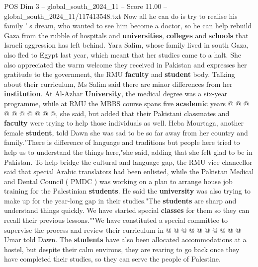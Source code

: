 \begin{textsample}{POS Dim 3 – global\_south\_2024\_11 – Score 11.00 – global\_south\_2024\_11/117413548.txt}
Now all he can do is try to realise his family ' s dream, who wanted to see him become a doctor, so he can help rebuild Gaza from the rubble of hospitals and \textbf{universities}, \textbf{colleges} and \textbf{schools} that Israeli aggression has left behind.
Yara Salim, whose family lived in south Gaza, also fled to Egypt last year, which meant that her studies came to a halt.
She also appreciated the warm welcome they received in Pakistan and expresses her gratitude to the government, the RMU \textbf{faculty} and \textbf{student} body.
Talking about their curriculum, Ms Salim said there are minor differences from her \textbf{institution}.
At Al-Azhar \textbf{University}, the medical degree was a six-year programme, while at RMU the MBBS course spans five \textbf{academic} years @ @ @ @ @ @ @ @ @ @, she said, but added that their Pakistani classmates and \textbf{faculty} were trying to help those individuals as well.
Heba Mourtaga, another female \textbf{student}, told Dawn she was sad to be so far away from her country and family."There is difference of language and traditions but people here tried to help us to understand the things here,"she said, adding that she felt glad to be in Pakistan.
To help bridge the cultural and language gap, the RMU vice chancellor said that special Arabic translators had been enlisted, while the Pakistan Medical and Dental Council ( PMDC ) was working on a plan to arrange house job training for the Palestinian \textbf{students}.
He said the \textbf{university} was also trying to make up for the year-long gap in their studies."The \textbf{students} are sharp and understand things quickly.
We have started special \textbf{classes} for them so they can recall their previous lessons.""We have constituted a special committee to supervise the process and review their curriculum in @ @ @ @ @ @ @ @ @ @ Umar told Dawn.
The \textbf{students} have also been allocated accommodations at a hostel, but despite their calm environs, they are rearing to go back once they have completed their studies, so they can serve the people of Palestine.

\end{textsample}
